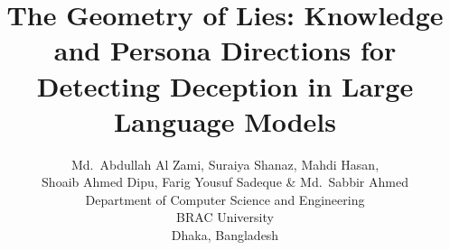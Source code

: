 \documentclass{article}
\title{The Geometry of Lies: Knowledge and Persona Directions for Detecting Deception in Large Language Models}
\author{Md.\ Abdullah Al Zami, Suraiya Shanaz, Mahdi Hasan, \\
Shoaib Ahmed Dipu, Farig Yousuf Sadeque \& Md.\ Sabbir Ahmed \\
Department of Computer Science and Engineering \\
BRAC University \\
Dhaka, Bangladesh}
\begin{document}
\maketitle

\begin{abstract}

\end{abstract}














\appendix

\end{document}
